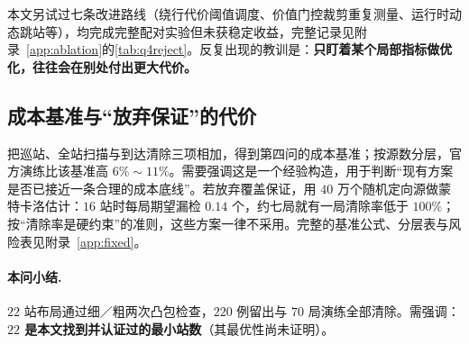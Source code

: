 本文另试过七条改进路线（绕行代价阈值调度、价值门控裁剪重复测量、运行时动态跳站等），均完成完整配对实验但未获稳定收益，完整记录见附录~\ref{app:ablation}的\cref{tab:q4reject}。反复出现的教训是：\textbf{只盯着某个局部指标做优化，往往会在别处付出更大代价。}

\subsection{成本基准与“放弃保证”的代价}\label{sec:q4:lb}

把巡站、全站扫描与到达清除三项相加，得到第四问的成本基准；按源数分层，官方演练比该基准高 $6\%\sim11\%$。需要强调这是一个经验构造，用于判断“现有方案是否已接近一条合理的成本底线”。若放弃覆盖保证，用 $40$ 万个随机定向源做蒙特卡洛估计：$16$ 站时每局期望漏检 $0.14$ 个，约七局就有一局清除率低于 $100\%$；按“清除率是硬约束”的准则，这些方案一律不采用。完整的基准公式、分层表与风险表见附录~\ref{app:fixed}。

\paragraph{本问小结.} $22$ 站布局通过细／粗两次凸包检查，$220$ 例留出与 $70$ 局演练全部清除。需强调：\textbf{$22$ 是本文找到并认证过的最小站数}（其最优性尚未证明）。
